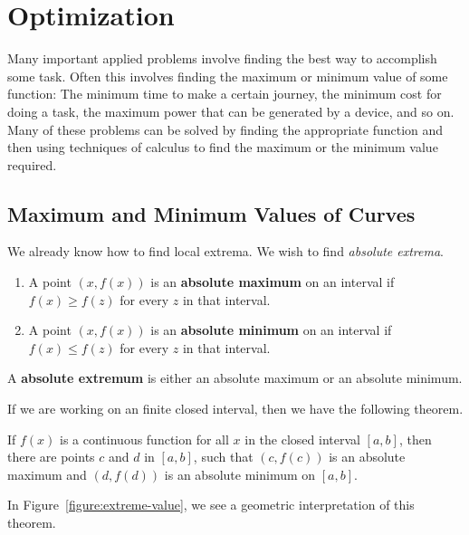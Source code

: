 \chapter{Optimization}




Many important applied problems involve finding the best way to
accomplish some task. Often this involves finding the maximum or
minimum value of some function: The minimum time to make a certain
journey, the minimum cost for doing a task, the maximum power that can
be generated by a device, and so on. Many of these problems can be
solved by finding the appropriate function and then using techniques
of calculus to find the maximum or the minimum value required.


\section{Maximum and Minimum Values of Curves}

We already know how to find local extrema. We wish to find
\textit{absolute extrema}.

\begin{definition}\hfil{}
\begin{enumerate}
\item A point $(x,f(x))$ is an \textbf{absolute maximum} on an interval
  if $f(x)\ge f(z)$ for every $z$ in that interval.
\item A point $(x,f(x))$ is an \textbf{absolute minimum} on an interval if
  $f(x)\le f(z)$ for every $z$ in that interval.
\end{enumerate}
A \textbf{absolute extremum} is either an
absolute maximum or an absolute minimum.
\end{definition}

If we are working on an finite closed interval, then we have the
following theorem.

\begin{mainTheorem}\label{theorem:evt}
If $f(x)$ is a continuous function for all $x$ in the closed interval
$[a,b]$, then there are points $c$ and $d$ in $[a,b]$, such that
$(c,f(c))$ is an absolute maximum and $(d,f(d))$ is an absolute
minimum on $[a, b]$.
\end{mainTheorem}
In Figure~\ref{figure:extreme-value}, we see a geometric
interpretation of this theorem. 

